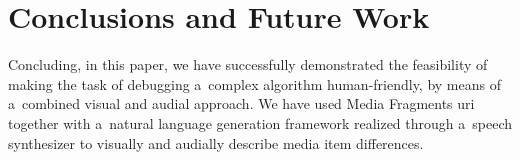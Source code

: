 \documentclass{article}
\begin{document}
\section{Conclusions and Future Work}
\label{sec:conclusions-and-future-work}

Concluding, in this paper, we have successfully demonstrated the feasibility
of making the task of debugging a~complex algorithm human-friendly,
by means of a~combined visual and audial approach.
We have used Media Fragments {\sc uri}
together with a~natural language generation framework
realized through a~speech synthesizer
to visually and audially describe media item differences.
 



\end{document}
